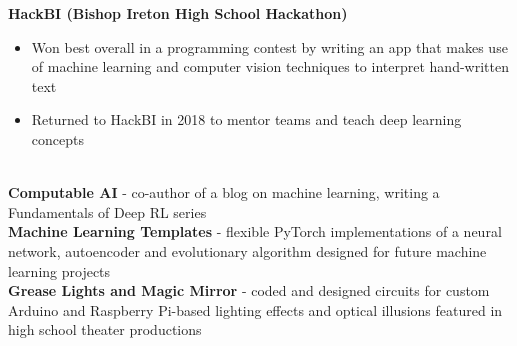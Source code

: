 \documentclass{article}
\begin{document}
\begin{center}
\begin{flushleft}
    \textbf{HackBI  (Bishop Ireton High School Hackathon)}

    \begin{itemize}
      \item Won best overall in a programming contest by writing an app that makes use of machine learning and computer vision techniques to interpret hand-written text
      \item Returned to HackBI in 2018 to mentor teams and teach deep learning concepts
    \end{itemize}

    {\large\textbf{\underline{}}} \\
    \textbf{Computable AI} - co-author of a blog on machine learning, writing a Fundamentals of Deep RL series \\
    \textbf{Machine Learning Templates} - flexible PyTorch implementations of a neural network, autoencoder and evolutionary algorithm designed for future machine learning projects \\
    \textbf{Grease Lights and Magic Mirror} - coded and designed circuits for custom Arduino and Raspberry Pi-based lighting effects and optical illusions featured in high school theater productions


  \end{flushleft}
  \end{center}
\end{document}
